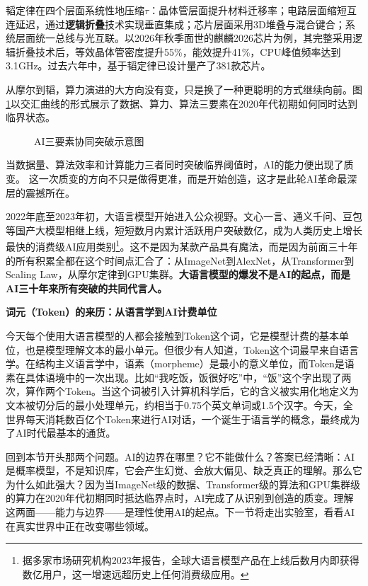 韬定律在四个层面系统性地压缩$\tau$：晶体管层面提升材料迁移率；电路层面缩短互连延迟，通过\textbf{逻辑折叠}技术实现垂直集成；芯片层面采用3D堆叠与混合键合；系统层面统一总线与光互联。以2026年秋季面世的麒麟2026芯片为例，其完整采用逻辑折叠技术后，等效晶体管密度提升55\%，能效提升41\%，CPU峰值频率达到3.1GHz。过去六年中，基于韬定律已设计量产了381款芯片。

从摩尔到韬，算力演进的大方向没有变，只是换了一种更聪明的方式继续向前。图\ref{fig:ch1_08}以交汇曲线的形式展示了数据、算力、算法三要素在2020年代初期如何同时达到临界状态。

\begin{figure}[htbp]
\centering
{}
\caption{AI三要素协同突破示意图}
\label{fig:ch1_08}
\end{figure}

当数据量、算法效率和计算能力三者同时突破临界阈值时，AI的能力便出现了质变。
这一次质变的方向不只是做得更准，而是开始创造，这才是此轮AI革命最深层的震撼所在。

2022年底至2023年初，大语言模型开始进入公众视野。文心一言、通义千问、豆包等国产大模型相继上线，短短数月内累计活跃用户突破数亿，成为人类历史上增长最快的消费级AI应用类别\footnote{据多家市场研究机构2023年报告，全球大语言模型产品在上线后数月内即获得数亿用户，这一增速远超历史上任何消费级应用。}。这不是因为某款产品具有魔法，而是因为前面三十年的所有积累全都在这个时间点汇合了：从ImageNet到AlexNet，从Transformer到Scaling Law，从摩尔定律到GPU集群。\textbf{大语言模型的爆发不是AI的起点，而是AI三十年来所有突破的共同代言人。}

\begin{funbox}
\small\textbf{词元（Token）的来历：从语言学到AI计费单位}

今天每个使用大语言模型的人都会接触到Token这个词，它是模型计费的基本单位，也是模型理解文本的最小单元。但很少有人知道，Token这个词最早来自语言学。在结构主义语言学中，语素（morpheme）是最小的意义单位，而Token是语素在具体语境中的一次出现。比如``我吃饭，饭很好吃''中，``饭''这个字出现了两次，算作两个Token。当这个词被引入计算机科学后，它的含义被实用化地定义为文本被切分后的最小处理单元，约相当于0.75个英文单词或1.5个汉字。今天，全世界每天消耗数百亿个Token来进行AI对话，一个诞生于语言学的概念，最终成为了AI时代最基本的通货。
\end{funbox}

回到本节开头那两个问题。AI的边界在哪里？它不能做什么？答案已经清晰：AI是概率模型，不是知识库，它会产生幻觉、会放大偏见、缺乏真正的理解。那么它为什么如此强大？因为当ImageNet级的数据、Transformer级的算法和GPU集群级的算力在2020年代初期同时抵达临界点时，AI完成了从识别到创造的质变。理解这两面——能力与边界——是理性使用AI的起点。下一节将走出实验室，看看AI在真实世界中正在改变哪些领域。

